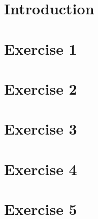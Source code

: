 \documentclass[a4paper,11pt]{article}
\begin{document}


\section{Introduction}


\section{Exercise 1}


\section{Exercise 2}


\section{Exercise 3}


\section{Exercise 4}


\section{Exercise 5}

\end{document}
